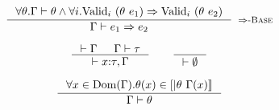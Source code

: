 \hfill\mbox{}
$$
\inference{
	\forall \theta. \iswellformed{\Gamma}{\theta} \land
	\generalconditionImpl{\theta\ e_1}{\theta\ e_2}
}{
	\issubref{\Gamma}{e_1}{e_2}
}[\rimpl]
$$

\hfill\mbox{\iswellformed{}{\Gamma}}
$$
\inference{
	\iswellformed{}{\Gamma} &&
	\iswellformed{\Gamma}{\tau}
}{
	\iswellformed{}{x\colon\tau,\Gamma}
}
\qquad
\inference{}{\iswellformed{}{\emptyset}}
$$

\hfill\mbox{\iswellformed{\Gamma}{\theta}}
$$
\inference{
	\forall x \in \text{Dom}(\Gamma). 
	\theta(x) \in \interp{\theta \ \Gamma(x)}
}{
	\iswellformed{\Gamma}{\theta}
}
$$